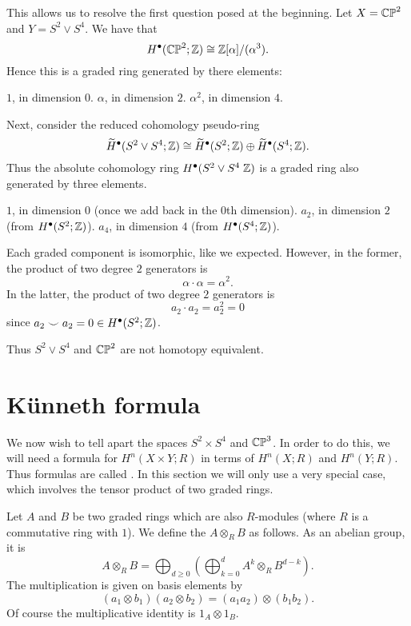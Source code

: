 This allows us to resolve the first question posed at the beginning.
Let $X = \mathbb{CP}^2$ and $Y = S^2 \vee S^4$.
We have that
\[ H^\bullet(\mathbb{CP}^2; \mathbb Z) \cong \mathbb Z[\alpha] / (\alpha^3). \]
Hence this is a graded ring generated by there elements:
\begin{itemize}
	\ii $1$, in dimension $0$.
	\ii $\alpha$, in dimension $2$.
	\ii $\alpha^2$, in dimension $4$.
\end{itemize}
Next, consider the reduced cohomology pseudo-ring
\[ \widetilde H^\bullet(S^2 \vee S^4; \mathbb Z) \cong
	\widetilde H^\bullet(S^2; \mathbb Z)
	\oplus \widetilde H^\bullet(S^4 ; \mathbb Z).
\]
Thus the absolute cohomology ring $H^\bullet(S^2 \vee S^4 \; \mathbb Z)$
is a graded ring also generated by three elements.
\begin{itemize}
	\ii $1$, in dimension $0$ (once we add back in the $0$th dimension).
	\ii $a_2$, in dimension $2$ (from $H^\bullet(S^2 ; \mathbb Z)$).
	\ii $a_4$, in dimension $4$ (from $H^\bullet(S^4 ; \mathbb Z)$).
\end{itemize}
Each graded component is isomorphic, like we expected.
However, in the former, the product of two degree $2$ generators is
\[ \alpha \cdot \alpha = \alpha^2. \]
In the latter, the product of two degree $2$ generators is
\[ a_2 \cdot a_2 = a_2^2 = 0 \]
since $a_2 \smile a_2 = 0 \in H^\bullet(S^2; \mathbb Z)$.

Thus $S^2 \vee S^4$ and $\mathbb{CP}^2$ are not homotopy equivalent.

\section{K\"unneth formula}
We now wish to tell apart the spaces $S^2 \times S^4$ and $\mathbb{CP}^3$.
In order to do this, we will need a formula
for $H^n(X \times Y; R)$ in terms of $H^n(X;R)$ and $H^n(Y;R)$.
Thus formulas are called .
In this section we will only use a very special case,
which involves the tensor product of two graded rings.

\begin{definition}
	Let $A$ and $B$ be two graded rings which are also $R$-modules
	(where $R$ is a commutative ring with $1$).
	We define the  $A \otimes_R B$ as follows.
	As an abelian group, it is 
	\[ A \otimes_R B = \bigoplus_{d \ge 0}
		\left( \bigoplus_{k=0}^{d} A^k \otimes_R B^{d-k}  \right). \]
	The multiplication is given on basis elements by
	\[ \left( a_1 \otimes b_1 \right)\left( a_2 \otimes b_2 \right)
		= (a_1a_2) \otimes (b_1b_2).
	\]
	Of course the multiplicative identity is $1_A \otimes 1_B$.
\end{definition}

